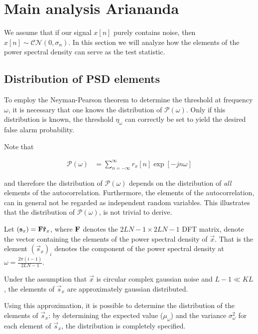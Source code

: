\documentclass[a4paper, openany, oneside]{memoir}
\begin{document}
\section{Main analysis Ariananda}

We assume that if our signal $x[n]$ purely contains noise, then $x[n] \sim \mathcal{CN}(0,\sigma_n)$. 
In this section we will analyze how the elements of the power spectral density can serve as the test statistic.

\subsection{Distribution of PSD elements}
To employ the Neyman-Pearson theorem to determine the threshold at frequency $\omega$, it is necessary that one knows the distribution of $\mathcal{P}\left(\omega\right)$. Only if this distribution is known, the threshold $\eta_{\omega}$ can correctly be set to yield the desired false alarm probability.

Note that 

\begin{align*}
\mathcal{P}\left(\omega\right) &= \sum_{n=-\infty}^{\infty} r_{x}[n] \exp\left[-jn\omega\right]
\end{align*}

and therefore the distribution of $\mathcal{P}(\omega)$ depends on the distribution of \emph{all} elements of the autocorrelation. Furthermore, the elements of the autocorrelation, can in general not be regarded as independent random variables. This illustrates that the distribution of $\mathcal{P}(\omega)$, is not trivial to derive. 

Let $(\boldsymbol{\mathbf{s}}_x) = \boldsymbol{\mathbf{F}} \boldsymbol{\mathbf{\hat{r}}}_x$, where $\boldsymbol{\mathbf{F}}$ denotes the $2LN-1 \times 2LN-1$ DFT matrix, denote the vector containing the elements of the power spectral density of $\vec{x}$. That is the element $\left(\vec{s}_{x}\right)_{i}$ denotes the component of the power spectral density at $\omega = \frac{2\pi (i-1)}{2LN-1}$.

\begin{blockTheorem}\label{th:psd_distr}
Under the assumption that $\vec{x}$ is circular complex gaussian noise and $L-1 \ll KL$, the elements of $\vec{s}_x$ are approximately gaussian distributed.
\end{blockTheorem}

Using this approximation, it is possible to determine the distribution of the elements  of $\vec{s}_x$: by determining the expected value ($\mu_{\omega}$) and the variance $\sigma_{\omega}^2$ for each element of $\vec{s}_x$, the distribution is completely specified.
\end{document}
